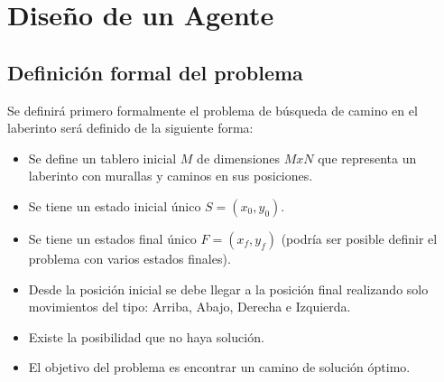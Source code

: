 \documentclass[letter, titlepage, 10pt]{article}
\begin{document}
\newpage

\section{Diseño de un Agente}

\subsection{Definición formal del problema}
Se definirá primero formalmente el problema de búsqueda de camino en el laberinto será definido de la siguiente forma:

\begin{itemize}
\item Se define un tablero inicial $M$ de dimensiones $MxN$ que representa un laberinto con murallas y caminos en sus posiciones.
\item Se tiene un estado inicial único $S = (x_0, y_0)$.
\item Se tiene un estados final único $F = (x_f, y_f)$ (podría ser posible definir el problema con varios estados finales).
\item Desde la posición inicial se debe llegar a la posición final realizando solo movimientos del tipo: Arriba, Abajo, Derecha e Izquierda.
\item Existe la posibilidad que no haya solución.
\item El objetivo del problema es encontrar un camino de solución óptimo.
\end{itemize}
\end{document}
